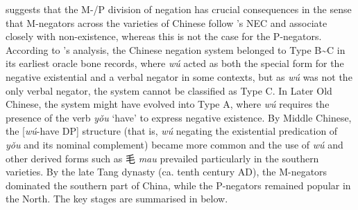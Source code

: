 \documentclass[output=paper,colorlinks,citecolor=brown,chinesefont]{langscibook}
\begin{document}
\citet{Zhang2002} suggests that the M-/P division of negation has crucial consequences in the sense that M-negators across the varieties of Chinese follow \citeauthor{Croft1991}'s NEC and associate closely with non-existence, whereas this is not the case for the P-negators. According to \citeauthor{Zhang2002}'s analysis, the Chinese negation system belonged to Type B\sim C in its earliest oracle bone records, where \textit{wú} acted as both the special form for the negative existential and a verbal negator in some contexts, but as \textit{wú} was not the only verbal negator, the system cannot be classified as Type C. In Later Old Chinese, the system might have evolved into Type A, where \textit{wú} requires the presence of the verb \textit{yǒu} `have' to express negative existence. By Middle Chinese, the [\textit{wú}-have DP] structure (that is, \textit{wú} negating the existential predication of \textit{yǒu} and its nominal complement) became more common and the use of \textit{wú} and other derived forms such as {\cn 毛} \textit{mau} prevailed particularly in the southern varieties. By the late Tang dynasty (ca. tenth century AD), the M-negators dominated the southern part of China, while the P-negators remained popular in the North. The key stages are summarised in  below.
\end{document}
